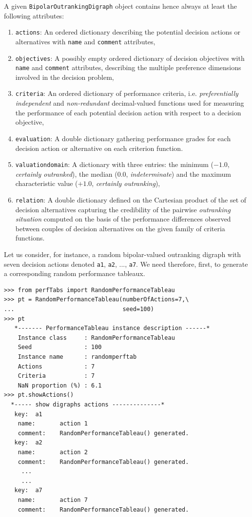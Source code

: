 A given \texttt{BipolarOutrankingDigraph} object contains hence always at least the following attributes:
\begin{enumerate}[topsep=3pt,partopsep=0pt]
\item \texttt{actions}: An ordered dictionary describing the potential decision actions or alternatives with {\tt name} and {\tt comment} attributes,
\item \texttt{objectives}: A possibly empty ordered dictionary of decision objectives with {\tt name} and {\tt comment} attributes, describing the multiple preference dimensions involved in the decision problem, 
\item \texttt{criteria}: An ordered dictionary of performance criteria, i.e. {\em preferentially independent\/} and {\em non-redundant\/} decimal-valued functions used for measuring the performance of each potential decision action with respect to a decision objective,
\item \texttt{evaluation}: A double dictionary gathering performance grades for each decision action or alternative on each criterion function. 
\item \texttt{valuationdomain}: A dictionary with three entries: the minimum ($-1.0$, \emph{certainly outranked}), the median ($0.0$, \emph{indeterminate}) and the maximum characteristic value ($+1.0$, \emph{certainly outranking}),
\item \texttt{relation}: A double dictionary defined on the Cartesian product of the set of decision alternatives capturing the credibility of the pairwise \emph{outranking situation} computed on the basis of the performance differences observed between couples of decision alternatives on the given family of criteria functions.   
\end{enumerate}

Let us consider, for instance, a random bipolar-valued outranking digraph with seven decision actions denoted \texttt{a1}, \texttt{a2}, ..., \texttt{a7}. We need therefore, first, to generate a corresponding random performance tableaux.
\begin{lstlisting}[caption={Generating a random performance tableau.},label=list:3.1]
>>> from perfTabs import RandomPerformanceTableau
>>> pt = RandomPerformanceTableau(numberOfActions=7,\
...                               seed=100)   
>>> pt
   *------- PerformanceTableau instance description ------*
    Instance class     : RandomPerformanceTableau
    Seed               : 100
    Instance name      : randomperftab
    Actions            : 7
    Criteria           : 7
    NaN proportion (%) : 6.1
>>> pt.showActions()
  *----- show digraphs actions --------------*
   key:  a1
    name:       action 1
    comment:    RandomPerformanceTableau() generated.
   key:  a2
    name:       action 2
    comment:    RandomPerformanceTableau() generated.
     ...
     ...
   key:  a7
    name:       action 7
    comment:    RandomPerformanceTableau() generated.
\end{lstlisting}


